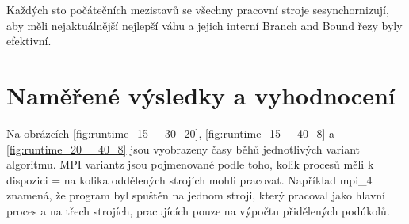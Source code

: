 \documentclass[epsf,epic,eepic,eepicemu]{article}\oddsidemargin=-5mm
\begin{document}
Každých sto počátečních mezistavů se všechny pracovní stroje sesynchornizují, aby měli nejaktuálnější nejlepší váhu a jejich interní Branch and Bound řezy byly efektivní.


\section{Naměřené výsledky a vyhodnocení}

Na obrázcích \ref{fig:runtime_15__30_20}, \ref{fig:runtime_15__40_8} a \ref{fig:runtime_20__40_8} jsou vyobrazeny časy běhů jednotlivých variant algoritmu. MPI variantz jsou pojmenované podle toho, kolik procesů měli k dispozici = na kolika oddělených strojích mohli pracovat.
Například mpi\_4 znamená, že program byl spuštěn na jednom stroji, který pracoval jako hlavní proces a na třech strojích, pracujících pouze na výpočtu přidělených podúkolů.
\end{document}
